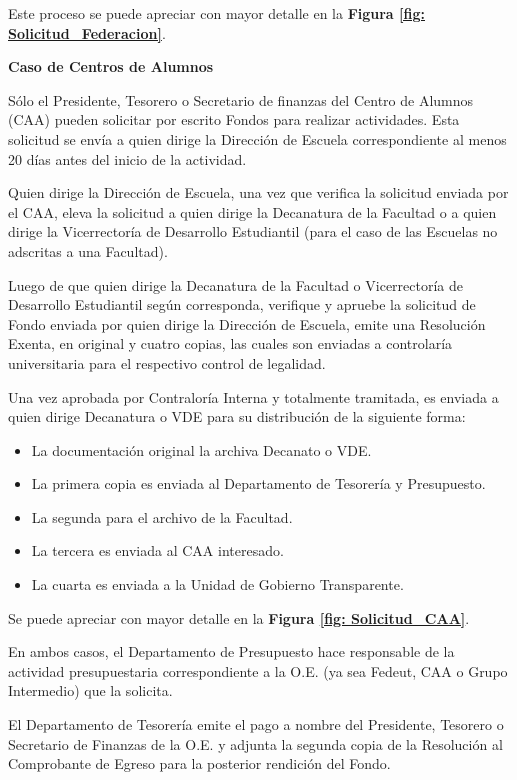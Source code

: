 \begin{tasks}[counter-format = {tsk[A].}]
    Este proceso se puede apreciar con mayor detalle en la \textbf{Figura \ref{fig: Solicitud_Federacion}}.

    \task \textbf{Caso de Centros de Alumnos}

    Sólo el Presidente, Tesorero o Secretario de finanzas del Centro de Alumnos (CAA) pueden solicitar por escrito Fondos para realizar actividades. Esta solicitud se envía a quien dirige la Dirección de Escuela correspondiente al menos 20 días antes del inicio de la actividad. 

    Quien dirige la Dirección de Escuela, una vez que verifica la solicitud enviada por el CAA, eleva la solicitud a quien dirige la Decanatura de la Facultad o a quien dirige la Vicerrectoría de Desarrollo Estudiantil (para el caso de las Escuelas no adscritas a una Facultad).

    Luego de que quien dirige la Decanatura de la Facultad o Vicerrectoría de Desarrollo Estudiantil según corresponda, verifique y apruebe la solicitud de Fondo enviada por quien dirige la Dirección de Escuela, emite una Resolución Exenta, en original y cuatro copias, las cuales son enviadas a controlaría universitaria para el respectivo control de legalidad.

    Una vez aprobada por Contraloría Interna y totalmente tramitada, es enviada a quien dirige Decanatura o VDE para su distribución de la siguiente forma: 
    \begin{itemize}
        \item La documentación original la archiva Decanato o VDE.
        \item La primera copia es enviada al Departamento de Tesorería y Presupuesto.
        \item La segunda para el archivo de la Facultad.
        \item La tercera es enviada al CAA interesado.
        \item La cuarta es enviada a la Unidad de Gobierno Transparente.
    \end{itemize}

    Se puede apreciar con mayor detalle en la \textbf{Figura \ref{fig: Solicitud_CAA}}.

\end{tasks}

En ambos casos, el Departamento de Presupuesto hace responsable de la actividad presupuestaria correspondiente a la O.E. (ya sea Fedeut, CAA o Grupo Intermedio) que la solicita.

El Departamento de Tesorería emite el pago a nombre del Presidente, Tesorero o Secretario de Finanzas de la O.E. y adjunta la segunda copia de la Resolución al Comprobante de Egreso para la posterior rendición del Fondo.

